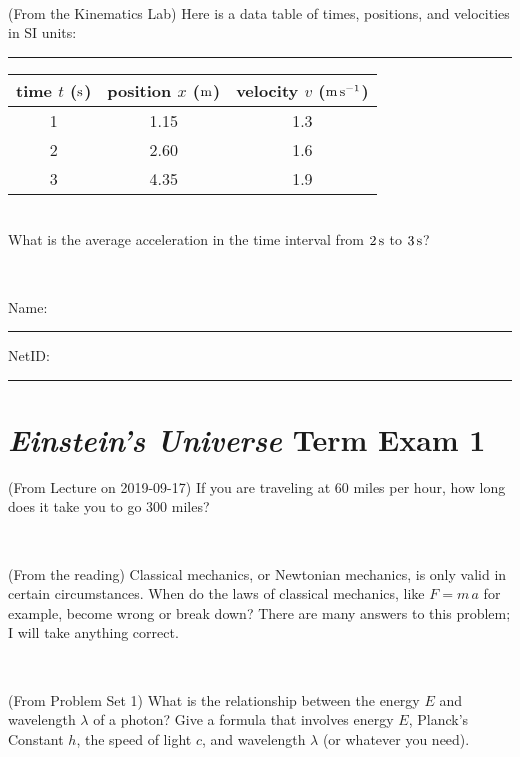 \documentclass[12pt, letterpaper]{article}
\begin{document}
\vfill ~

\begin{problem} (From the Kinematics Lab)
Here is a data table of times, positions, and velocities in SI units:\\
\rule{1.0in}{0pt}\begin{tabular}{c|c|c}
time $t$ ($\mathrm{s}$) & position $x$ ($\mathrm{m}$) & velocity $v$ ($\mathrm{m}\,\mathrm{s}^{-1}$) \\
\hline
1 & 1.15 & 1.3 \\
2 & 2.60 & 1.6 \\
3 & 4.35 & 1.9 \\
\hline
\end{tabular}\\
What is the average acceleration in the time interval from $2\,\mathrm{s}$ to $3\,\mathrm{s}$?
\end{problem}


\vfill ~


\cleardoublepage



\noindent
Name: \rule[-1ex]{0.60\textwidth}{0.1pt}
NetID: \rule[-1ex]{0.20\textwidth}{0.1pt}

\section*{\textsl{Einstein's Universe} Term Exam 1}
\setcounter{problem}{1}


\begin{problem} (From Lecture on 2019-09-17)
If you are traveling at 60 miles per hour, how long does
it take you to go 300 miles?
\end{problem}


\vfill ~

\begin{problem} (From the reading)
Classical mechanics, or Newtonian mechanics, is only valid in certain
circumstances. When do the laws of classical mechanics, like $F =
m\,a$ for example, become wrong or break down? There are many answers
to this problem; I will take anything correct.
\end{problem}


\vfill ~

\begin{problem} (From Problem Set 1)
What is the relationship between the energy $E$ and wavelength
$\lambda$ of a photon? Give a formula that involves energy $E$,
Planck's Constant $h$, the speed of light $c$, and wavelength
$\lambda$ (or whatever you need).
\end{problem}
\end{document}
